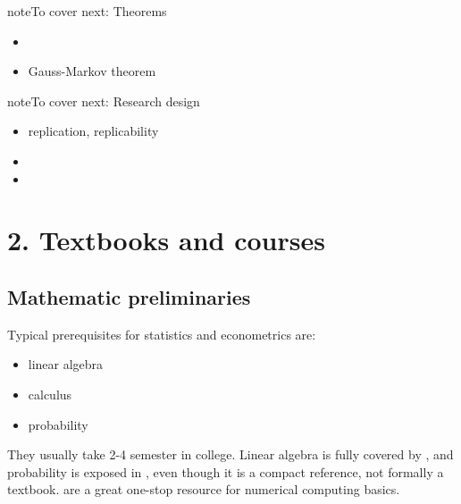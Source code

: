 \documentclass[letterpaper,10pt,english]{sphinxmanual}
\begin{document}
\begin{sphinxadmonition}{note}{To cover next: Theorems}
\begin{itemize}
\item {} 

\item {} 
Gauss-Markov theorem

\end{itemize}
\end{sphinxadmonition}

\begin{sphinxadmonition}{note}{To cover next: Research design}
\begin{itemize}
\item {} 
replication, replicability

\item {} 

\item {} 

\end{itemize}
\end{sphinxadmonition}


\chapter{2. Textbooks and courses}
\label{\detokenize{textbook/index:textbooks-and-courses}}\label{\detokenize{textbook/index::doc}}

\section{Mathematic preliminaries}
\label{\detokenize{textbook/preliminaries:mathematic-preliminaries}}\label{\detokenize{textbook/preliminaries::doc}}
Typical prerequisites for statistics and econometrics are:
\begin{itemize}
\item {} 
linear algebra

\item {} 
calculus

\item {} 
probability

\end{itemize}

They usually take 2-4 semester in college. Linear algebra is fully covered by
, and probability is exposed in , even though it is a compact reference, not formally a textbook.  are a great one-stop resource for numerical computing basics.
\end{document}
